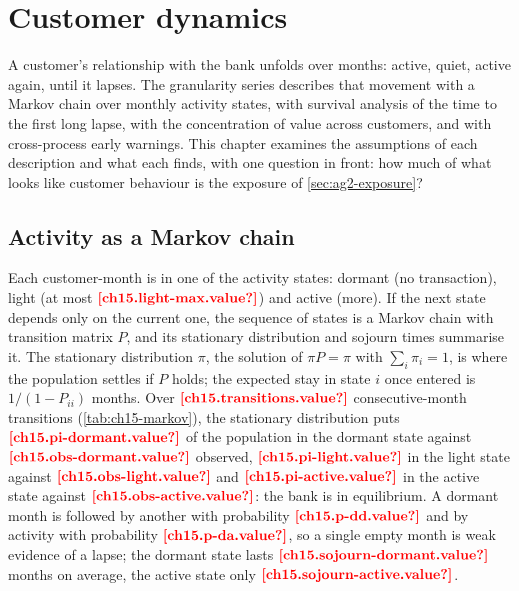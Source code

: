 \chapter{Customer dynamics}\label{ch:customer-dynamics}

A customer's relationship with the bank unfolds over months: active, quiet, active again, until it lapses. The
granularity series describes that movement with a Markov chain over monthly activity states, with survival analysis of the
time to the first long lapse, with the concentration of value across customers, and with cross-process early warnings.
This chapter examines the assumptions of each description and what each finds, with one question in front: how much of what
looks like customer behaviour is the exposure of \cref{sec:ag2-exposure}?

\section{Activity as a Markov chain}\label{sec:cd-markov}

Each customer-month is in one of the activity states: dormant (no transaction), light (at most $\est{ch15.light-max}{value}$) and
active (more). If the next state depends only on the current one, the sequence of states is a Markov chain with transition
matrix $P$, and its stationary distribution and sojourn times summarise it. The stationary distribution $\pi$, the solution of $\pi P = \pi$ with
$\sum_i \pi_i = 1$, is where the population settles if $P$ holds; the expected stay in state $i$ once entered is
$1 / (1 - P_{ii})$ months. Over $\est{ch15.transitions}{value}$ consecutive-month transitions (\cref{tab:ch15-markov}), the
stationary distribution puts $\est{ch15.pi-dormant}{value}$ of the population in the dormant state against
$\est{ch15.obs-dormant}{value}$ observed, $\est{ch15.pi-light}{value}$ in the light state against $\est{ch15.obs-light}{value}$
and $\est{ch15.pi-active}{value}$ in the active state against $\est{ch15.obs-active}{value}$: the bank is in equilibrium. A
dormant month is followed by another with probability $\est{ch15.p-dd}{value}$ and by activity with probability
$\est{ch15.p-da}{value}$, so a single empty month is weak evidence of a lapse; the dormant state lasts
$\est{ch15.sojourn-dormant}{value}$ months on average, the active state only $\est{ch15.sojourn-active}{value}$.



